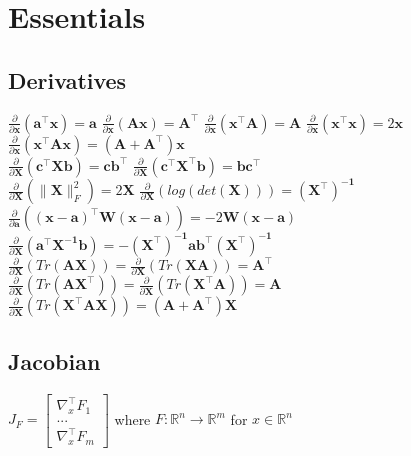 \section{Essentials}
\subsection*{Derivatives}
$\frac{\partial}{\partial \mathbf{x}}(\mathbf{a}^\top \mathbf{x}) = \mathbf{a}$ \quad
$\frac{\partial}{\partial \mathbf{x}}(\mathbf{A} \mathbf{x}) = \mathbf{A}^\top$ \quad
$\frac{\partial}{\partial \mathbf{x}}(\mathbf{x}^\top \mathbf{A}) = \mathbf{A}$ \quad
$\frac{\partial}{\partial \mathbf{x}}(\mathbf{x}^\top \mathbf{x}) = 2\mathbf{x}$ \quad
$\frac{\partial}{\partial \mathbf{x}}(\mathbf{x}^\top \mathbf{A}\mathbf{x}) = (\mathbf{A} + \mathbf{A}^\top)\mathbf{x}$ \\
$\frac{\partial}{\partial \mathbf{X}}(\mathbf{c}^\top \mathbf{X} \mathbf{b}) = \mathbf{c}\mathbf{b}^\top$ \quad
$\frac{\partial}{\partial \mathbf{X}}(\mathbf{c}^\top \mathbf{X}^\top \mathbf{b}) = \mathbf{b}\mathbf{c}^\top$ \\
$\frac{\partial}{\partial \mathbf{X}}(\|\mathbf{X}\|_F^2) = 2\mathbf{X}$ \quad
$\frac{\partial}{\partial \mathbf{X}}(log(det(\mathbf{X}))) = \mathbf{(X^\top)^{-1}}$\\
$\frac{\partial}{\partial \mathbf{a}}(\mathbf{(x-a)^\top W(x-a)}) = -2\mathbf{W(x-a)}$ \\
$\frac{\partial}{\partial \mathbf{X}}(\mathbf{a^\top X^{-1}b}) = \mathbf{-(X^\top)^{-1}ab^\top(X^\top)^{-1}}$ \\
$\frac{\partial}{\partial \mathbf{X}}(Tr(\mathbf{AX})) = \frac{\partial}{\partial \mathbf{X}}(Tr(\mathbf{XA})) = \mathbf{A^\top}$ \\
$\frac{\partial}{\partial \mathbf{X}}(Tr(\mathbf{AX^\top})) = \frac{\partial}{\partial \mathbf{X}}(Tr(\mathbf{X^\top A})) = \mathbf{A}$ \\
$\frac{\partial}{\partial \mathbf{X}}(Tr(\mathbf{X^\top AX})) = \mathbf{(A+A^\top)X}$ \\ 

\subsection*{Jacobian}
$J_F= \begin{bmatrix} \nabla_x^\top F_1\\...\\\nabla_x^\top F_m\end{bmatrix}$ where $F:\mathbb{R}^n \rightarrow \mathbb{R}^m$ for $x \in \mathbb{R}^n$

